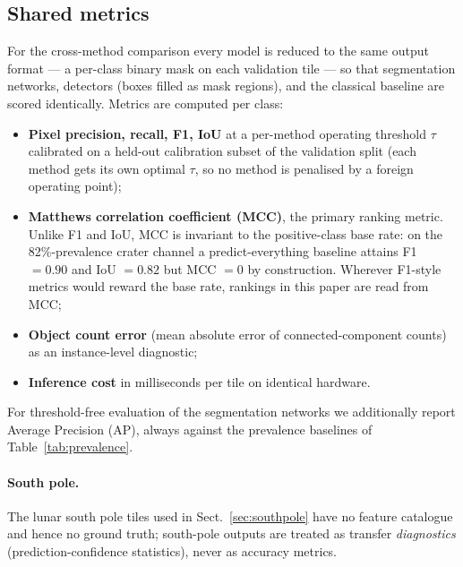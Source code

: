\subsection{Shared metrics}
\label{sec:metrics_protocol}

For the cross-method comparison every model is reduced to the same output format --- a per-class binary mask on each validation tile --- so that segmentation networks, detectors (boxes filled as mask regions), and the classical baseline are scored identically. Metrics are computed per class:

\begin{itemize}
    \item \textbf{Pixel precision, recall, F1, IoU} at a per-method operating threshold $\tau$ calibrated on a held-out calibration subset of the validation split (each method gets its own optimal $\tau$, so no method is penalised by a foreign operating point);
    \item \textbf{Matthews correlation coefficient (MCC)}, the primary ranking metric. Unlike F1 and IoU, MCC is invariant to the positive-class base rate: on the 82\%-prevalence crater channel a predict-everything baseline attains F1 $=0.90$ and IoU $=0.82$ but MCC $=0$ by construction. Wherever F1-style metrics would reward the base rate, rankings in this paper are read from MCC;
    \item \textbf{Object count error} (mean absolute error of connected-component counts) as an instance-level diagnostic;
    \item \textbf{Inference cost} in milliseconds per tile on identical hardware.
\end{itemize}

For threshold-free evaluation of the segmentation networks we additionally report Average Precision (AP), always against the prevalence baselines of Table~\ref{tab:prevalence}.

\paragraph{South pole.}
The lunar south pole tiles used in Sect.~\ref{sec:southpole} have no feature catalogue and hence no ground truth; south-pole outputs are treated as transfer \emph{diagnostics} (prediction-confidence statistics), never as accuracy metrics.
